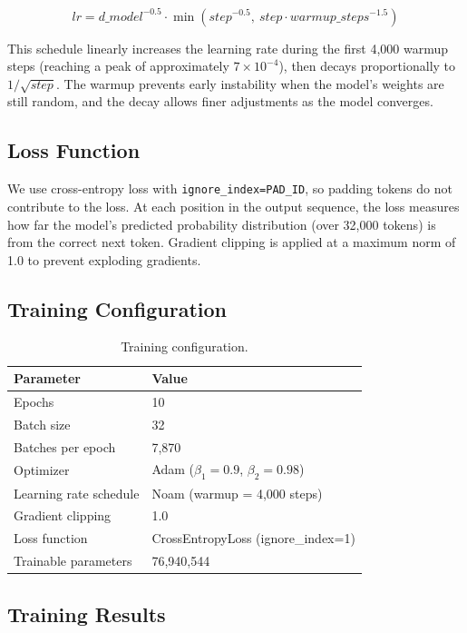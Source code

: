 \documentclass[11pt]{article}
\begin{document}
\[
lr = d\_model^{-0.5} \cdot \min(step^{-0.5},\ step \cdot warmup\_steps^{-1.5})
\]

This schedule linearly increases the learning rate during the first 4,000 warmup steps (reaching a peak of approximately $7 \times 10^{-4}$), then decays proportionally to $1/\sqrt{step}$. The warmup prevents early instability when the model's weights are still random, and the decay allows finer adjustments as the model converges.

\subsection{Loss Function}

We use cross-entropy loss with \texttt{ignore\_index=PAD\_ID}, so padding tokens do not contribute to the loss. At each position in the output sequence, the loss measures how far the model's predicted probability distribution (over 32,000 tokens) is from the correct next token. Gradient clipping is applied at a maximum norm of 1.0 to prevent exploding gradients.

\subsection{Training Configuration}

\begin{table}[h]
\centering
\begin{tabular}{@{}ll@{}}
\toprule
\textbf{Parameter} & \textbf{Value} \\
\midrule
Epochs & 10 \\
Batch size & 32 \\
Batches per epoch & 7,870 \\
Optimizer & Adam ($\beta_1=0.9$, $\beta_2=0.98$) \\
Learning rate schedule & Noam (warmup = 4,000 steps) \\
Gradient clipping & 1.0 \\
Loss function & CrossEntropyLoss (ignore\_index=1) \\
Trainable parameters & 76,940,544 \\
\bottomrule
\end{tabular}
\caption{Training configuration.}
\label{tab:training_config}
\end{table}

\subsection{Training Results}
\end{document}
